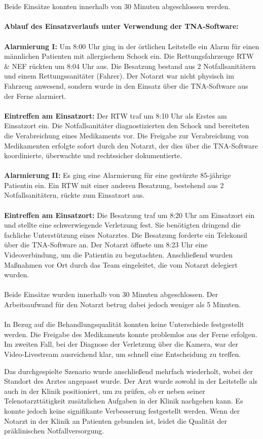 \\\\
Beide Einsätze konnten innerhalb von 30 Minuten abgeschlossen werden.
\\\\
\textbf{Ablauf des Einsatzverlaufs unter Verwendung der TNA-Software:}
\\\\
\textbf{Alarmierung I:}
Um 8:00 Uhr ging in der örtlichen Leitstelle ein Alarm für einen männlichen Patienten mit allergischem Schock ein. Die Rettungsfahrzeuge RTW \& NEF rückten um 8:04 Uhr aus. Die Besatzung bestand aus 2 Notfallsanitätern und einem Rettungssanitäter (Fahrer). Der Notarzt war nicht physisch im Fahrzeug anwesend, sondern wurde in den Einsatz über die TNA-Software aus der Ferne alarmiert.
\\\\
\textbf{Eintreffen am Einsatzort:}
Der RTW traf um 8:10 Uhr als Erstes am Einsatzort ein. Die Notfallsanitäter diagnostizierten den Schock und bereiteten die Verabreichung eines Medikaments vor. Die Freigabe zur Verabreichung von Medikamenten erfolgte sofort durch den Notarzt, der dies über die TNA-Software koordinierte, überwachte und rechtssicher dokumentierte.
\\\\
\textbf{Alarmierung II:}
Es ging eine Alarmierung für eine gestürzte 85-jährige Patientin ein. Ein RTW mit einer anderen Besatzung, bestehend aus 2 Notfallsanitätern, rückte zum Einsatzort aus.
\\\\
\textbf{Eintreffen am Einsatzort:}
Die Besatzung traf um 8:20 Uhr am Einsatzort ein und stellte eine schwerwiegende Verletzung fest. Sie benötigten dringend die fachliche Unterstützung eines Notarztes. Die Besatzung forderte ein Telekonsil über die TNA-Software an. Der Notarzt öffnete um 8:23 Uhr eine Videoverbindung, um die Patientin zu begutachten. Anschließend wurden Maßnahmen vor Ort durch das Team eingeleitet, die vom Notarzt delegiert wurden.
\\\\
Beide Einsätze wurden innerhalb von 30 Minuten abgeschlossen. Der Arbeitsaufwand für den Notarzt betrug dabei jedoch weniger als 5 Minuten.
\\\\
In Bezug auf die Behandlungsqualität konnten keine Unterschiede festgestellt werden. Die Freigabe des Medikaments konnte problemlos aus der Ferne erfolgen. Im zweiten Fall, bei der Diagnose der Verletzung über die Kamera, war der Video-Livestream ausreichend klar, um schnell eine Entscheidung zu treffen.

Das durchgespielte Szenario wurde anschließend mehrfach wiederholt, wobei der Standort des Arztes angepasst wurde. Der Arzt wurde sowohl in der Leitstelle als auch in der Klinik positioniert, um zu prüfen, ob er neben seiner Telenotarzttätigkeit zusätzlichen Aufgaben in der Klinik nachgehen kann. Es konnte jedoch keine signifikante Verbesserung festgestellt werden. Wenn der Notarzt in der Klinik an Patienten gebunden ist, leidet die Qualität der präklinischen Notfallversorgung.